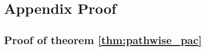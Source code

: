 \documentclass{article}
\theoremstyle{plain}
\theoremstyle{definition}
\theoremstyle{remark}
\begin{document}









\clearpage      %
\onecolumn      %
\appendix       %

\section{Appendix Proof}



\subsection{Proof of theorem \ref{thm:pathwise_pac}}
\label{proof:theorem all}
\end{document}
